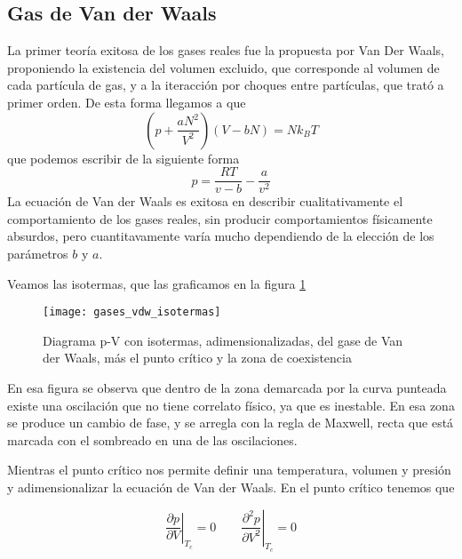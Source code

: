 \subsection{Gas de Van der Waals}

La primer teoría exitosa de los gases reales fue la propuesta por Van Der Waals, proponiendo la existencia del volumen excluido, que corresponde al volumen de cada partícula de gas, y a la iteracción por choques entre partículas, que trató a primer orden.
De esta forma llegamos a que 
\begin{equation}
\left(p + \frac{a N^2}{V^2}\right)(V- b N) = N k_B T
\label{eq:vanderwalls}
\end{equation}
que podemos escribir de la siguiente forma
\begin{equation}
p = \frac{R T}{v - b} - \frac{a}{v^2}
\label{eq:vanderwalls_intensivo}
\end{equation}
La ecuación de Van der Waals es exitosa en describir cualitativamente el comportamiento de los gases reales, sin producir comportamientos físicamente absurdos, pero cuantitavamente varía mucho dependiendo de la elección de los parámetros $b$ y $a$.

Veamos las isotermas, que las graficamos en la figura \ref{fig:gases_vdw_isotermas}
\begin{figure}[H]
    \centering
    \texttt{[image: gases\_vdw\_isotermas]}
    \caption{Diagrama p-V con isotermas, adimensionalizadas, del gase de Van der Waals, más el punto crítico y la zona de coexistencia}
    \label{fig:gases_vdw_isotermas}
\end{figure}

En esa figura se observa que dentro de la zona demarcada por la curva punteada existe una oscilación que no tiene correlato físico, ya que es inestable.
En esa zona se produce un cambio de fase, y se arregla con la regla de Maxwell, recta que está marcada con el sombreado en una de las oscilaciones.

Mientras el punto crítico nos permite definir una temperatura, volumen y presión y adimensionalizar la ecuación de Van der Waals.
En el punto crítico tenemos que

\begin{equation}
    \left.\frac{\partial p}{\partial V}\right|_{T_c} = 0 \qquad \left.\frac{\partial^2 p}{\partial V^2}\right|_{T_c} = 0
\end{equation}


